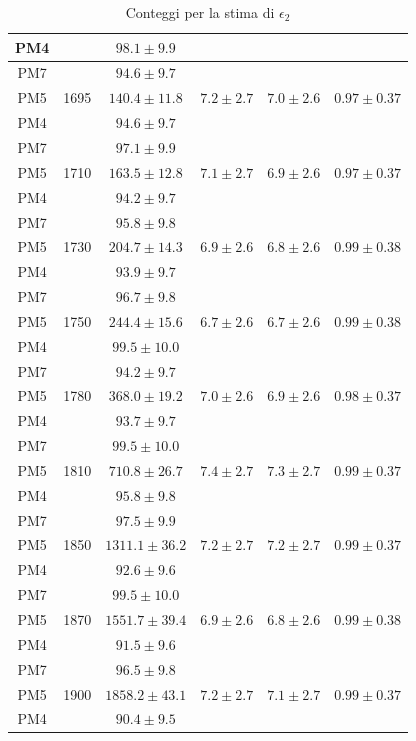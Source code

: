 \documentclass{article}
\begin{document}
\begin{table}[H]
\begin{tabular}{|c|c|c|c|c|c|}
PM4 & & $98.1 \pm 9.9$ & & & \\ 
\hline 
PM7 & & $94.6 \pm 9.7$ & & & \\ 
PM5 & 1695 & $140.4 \pm 11.8$& $7.2 \pm 2.7$  & $7.0 \pm 2.6$ & $0.97 \pm 0.37$\\ 
PM4 & & $94.6 \pm 9.7$ & & & \\ 
\hline 
PM7 & & $97.1 \pm 9.9$ & & & \\ 
PM5 & 1710 & $163.5 \pm 12.8$& $7.1 \pm 2.7$  & $6.9 \pm 2.6$ & $0.97 \pm 0.37$\\ 
PM4 & & $94.2 \pm 9.7$ & & & \\ 
\hline 
PM7 & & $95.8 \pm 9.8$ & & & \\ 
PM5 & 1730 & $204.7 \pm 14.3$& $6.9 \pm 2.6$  & $6.8 \pm 2.6$ & $0.99 \pm 0.38$\\ 
PM4 & & $93.9 \pm 9.7$ & & & \\ 
\hline 
PM7 & & $96.7 \pm 9.8$ & & & \\ 
PM5 & 1750 & $244.4 \pm 15.6$& $6.7 \pm 2.6$  & $6.7 \pm 2.6$ & $0.99 \pm 0.38$\\ 
PM4 & & $99.5 \pm 10.0$ & & & \\ 
\hline 
PM7 & & $94.2 \pm 9.7$ & & & \\ 
PM5 & 1780 & $368.0 \pm 19.2$& $7.0 \pm 2.6$  & $6.9 \pm 2.6$ & $0.98 \pm 0.37$\\ 
PM4 & & $93.7 \pm 9.7$ & & & \\ 
\hline 
PM7 & & $99.5 \pm 10.0$ & & & \\ 
PM5 & 1810 & $710.8 \pm 26.7$& $7.4 \pm 2.7$  & $7.3 \pm 2.7$ & $0.99 \pm 0.37$\\ 
PM4 & & $95.8 \pm 9.8$ & & & \\ 
\hline 
PM7 & & $97.5 \pm 9.9$ & & & \\ 
PM5 & 1850 & $1311.1 \pm 36.2$& $7.2 \pm 2.7$  & $7.2 \pm 2.7$ & $0.99 \pm 0.37$\\ 
PM4 & & $92.6 \pm 9.6$ & & & \\ 
\hline 
PM7 & & $99.5 \pm 10.0$ & & & \\ 
PM5 & 1870 & $1551.7 \pm 39.4$& $6.9 \pm 2.6$  & $6.8 \pm 2.6$ & $0.99 \pm 0.38$\\ 
PM4 & & $91.5 \pm 9.6$ & & & \\ 
\hline 
PM7 & & $96.5 \pm 9.8$ & & & \\ 
PM5 & 1900 & $1858.2 \pm 43.1$& $7.2 \pm 2.7$  & $7.1 \pm 2.7$ & $0.99 \pm 0.37$\\ 
PM4 & & $90.4 \pm 9.5$ & & & \\ 
\hline
\end{tabular}
\caption{Conteggi per la stima di $\epsilon_2$}\label{tabepsilon2}
\end{table}
\end{document}
